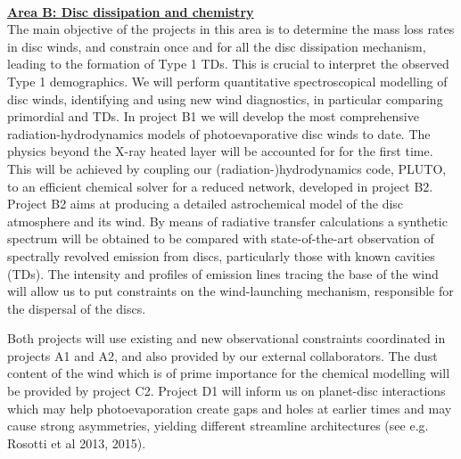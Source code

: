\documentclass[12pt]{article}
\begin{document}
%



\
\mbox{}\vspace{1em}\\
\noindent\underline{\bf Area B: Disc dissipation and chemistry }\\

\noindent The main objective of the projects in this area is to
determine the mass loss rates in disc winds, and constrain once and
for all the disc dissipation mechanism, leading to the formation of
Type 1 TDs. This is crucial to interpret the observed Type 1
demographics. We will perform quantitative spectroscopical modelling
of disc winds, identifying and using new wind diagnostics, in
particular comparing primordial and TDs. In project B1 we will develop
the most comprehensive radiation-hydrodynamics models of
photoevaporative disc winds to date. The physics beyond the X-ray
heated layer will be accounted for for the first time. This will be
achieved by coupling our  (radiation-)hydrodynamics code, PLUTO, to an efficient 
chemical solver for a reduced network,
developed in project B2. Project B2 aims at producing a detailed astrochemical model of the
disc atmosphere and its wind. By means of radiative transfer
calculations a synthetic spectrum will be obtained to be compared with
state-of-the-art observation of spectrally revolved emission from
discs, particularly those with known cavities (TDs). The intensity and
profiles of emission lines tracing the base of the wind will allow us
to put constraints on the wind-launching mechanism, responsible for
the dispersal of the discs.  

Both projects will use existing and new observational
constraints coordinated in projects A1 and A2, and also provided by
our external collaborators. The dust 
content of the wind which is of prime importance for the chemical
modelling will be provided by project C2. Project D1 will inform us on
planet-disc
interactions which may help photoevaporation create gaps and holes at
earlier times and may cause 
strong asymmetries, yielding different streamline
architectures (see e.g. Rosotti et al 2013, 2015).\\ 
\end{document}
